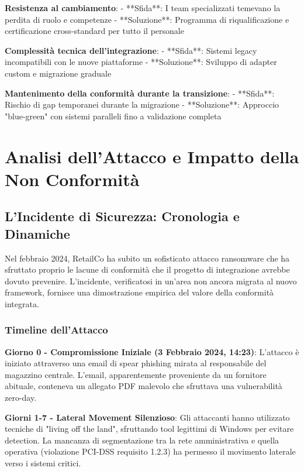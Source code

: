 \textbf{Resistenza al cambiamento}: 
- **Sfida**: I team specializzati temevano la perdita di ruolo e competenze
- **Soluzione**: Programma di riqualificazione e certificazione cross-standard per tutto il personale

\textbf{Complessità tecnica dell'integrazione}:
- **Sfida**: Sistemi legacy incompatibili con le nuove piattaforme
- **Soluzione**: Sviluppo di adapter custom e migrazione graduale

\textbf{Mantenimento della conformità durante la transizione}:
- **Sfida**: Rischio di gap temporanei durante la migrazione
- **Soluzione**: Approccio "blue-green" con sistemi paralleli fino a validazione completa

\section{Analisi dell'Attacco e Impatto della Non Conformità}
\label{sec:4.8_analisi_attacco}

\subsection{L'Incidente di Sicurezza: Cronologia e Dinamiche}
\label{subsec:4.8.1_incidente}

Nel febbraio 2024, RetailCo ha subito un sofisticato attacco ransomware che ha sfruttato proprio le lacune di conformità che il progetto di integrazione avrebbe dovuto prevenire. L'incidente, verificatosi in un'area non ancora migrata al nuovo framework, fornisce una dimostrazione empirica del valore della conformità integrata.

\subsubsection{Timeline dell'Attacco}

\textbf{Giorno 0 - Compromissione Iniziale (3 Febbraio 2024, 14:23)}:
L'attacco è iniziato attraverso una email di spear phishing mirata al responsabile del magazzino centrale. L'email, apparentemente proveniente da un fornitore abituale, conteneva un allegato PDF malevolo che sfruttava una vulnerabilità zero-day.

\textbf{Giorni 1-7 - Lateral Movement Silenzioso}:
Gli attaccanti hanno utilizzato tecniche di "living off the land", sfruttando tool legittimi di Windows per evitare detection. La mancanza di segmentazione tra la rete amministrativa e quella operativa (violazione PCI-DSS requisito 1.2.3) ha permesso il movimento laterale verso i sistemi critici.

